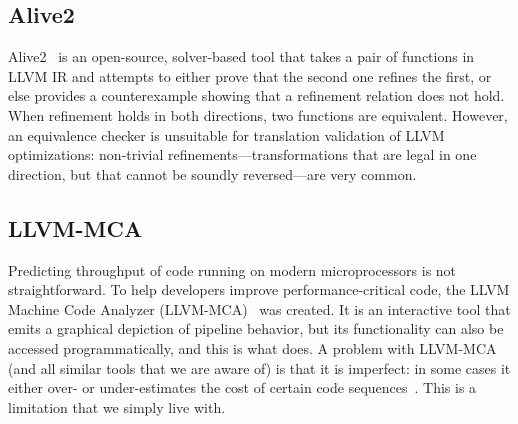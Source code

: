 \subsection{Alive2}

Alive2~\cite{alive2} is an open-source, solver-based tool that takes a
pair of functions in LLVM IR and attempts to either prove that the
second one refines the first, or else provides a counterexample
showing that a refinement relation does not hold.
%
When refinement holds in both directions, two functions are equivalent.
%
However, an equivalence checker is unsuitable for translation
validation of LLVM optimizations: non-trivial
refinements---transformations that are legal in one direction, but
that cannot be soundly reversed---are very common.


\subsection{LLVM-MCA}

Predicting throughput of code running on modern microprocessors is not
straightforward.
%
To help developers improve performance-critical code, the LLVM Machine
Code Analyzer (LLVM-MCA)~\cite{llvmmca} was created.
%
It is an interactive tool that emits a graphical depiction of pipeline
behavior, but its functionality can also be accessed programmatically,
and this is what \tool{} does.
%
A problem with LLVM-MCA (and all similar tools that we are aware of)
is that it is imperfect: in some cases it either over- or
under-estimates the cost of certain code sequences~\cite{ithemal}.
%
This is a limitation that we simply live with.
